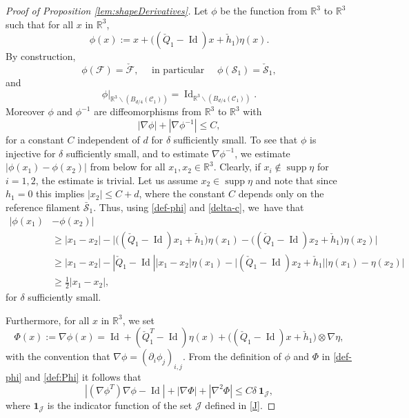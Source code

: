 \documentclass[11pt]{article}
\providecommand{\widecheck}{\check}
\newcommand{\R}{\mathbb{R}}
\DeclareMathOperator{\Id}{Id}
\DeclareMathOperator{\supp}{supp}
\theoremstyle{definition}
\theoremstyle{remark}
\begin{document}
\begin{proof}[Proof of Proposition \ref{lem:shapeDerivatives}]
Let $\phi$ be the function from $\R^3$ to $\R^3$ such that for all $x$ in $\R^3$,
\begin{equation} \label{def-phi}
\phi(x) := x + \bigl((\widecheck Q_1 - \Id)x + \widecheck h_1 \bigr) \eta(x).
\end{equation}
By construction,
\begin{equation} \label{dodomain}
\phi(\mathcal F) = \widecheck {\mathcal F}, \quad \text{ in particular } \quad
\phi(\mathcal S_1) = \widecheck {\mathcal S}_1,
\end{equation}
and
\begin{equation} \label{elaid}
\phi \vert_{\R^3 \smallsetminus (B_{d/4}(\mathcal C_1))} = \Id_{\R^3 \smallsetminus (B_{d/4}(\mathcal C_1))}.
\end{equation}
Moreover $\phi$ and $\phi^{-1}$ are diffeomorphisms from $\R^3$ to $\R^3$
with
\begin{equation}
\label{pourcp}
|\nabla \phi| + |\nabla \phi^{-1}| \leq C,
\end{equation}
for a constant $C$ independent of $d$ for $\delta$ sufficiently small.
To see that $\phi$ is injective for $\delta$ sufficiently small, and to estimate $\nabla \phi^{-1}$, we estimate $|\phi(x_1) - \phi(x_2)|$ from below for all $x_1,x_2 \in \R^3$. Clearly, if $x_i \not \in \supp \eta$ for $i = 1,2$, the estimate is trivial.
Let us assume $x_2 \in \supp \eta$ and note that since $h_1 = 0$ this implies $|x_2| \leq C + d$,
where the constant $C$ depends only on the reference filament $\bar{\mathcal S}_1$.
Thus, using \eqref{def-phi} and \eqref{delta-c}, we~have that
\begin{align*}
|\phi(x_1) &- \phi(x_2)| \\
&\geq |x_1 - x_2| - \big|\big((\widecheck Q_1 - \Id)x_1 + \widecheck h_1 \big) \eta(x_1) - \big((\widecheck Q_1 - \Id)x_2 + \widecheck h_1 \big) \eta(x_2)\big| \\
& \geq |x_1 - x_2| - |\widecheck Q_1 - \Id||x_1 - x_2| \eta(x_1) - \big|(\widecheck Q_1 - \Id)x_2 + \widecheck h_1 \big||\eta(x_1) - \eta(x_2)| \\
& \geq \frac 1 2 |x_1 - x_2|,
\end{align*}
for $\delta$ sufficiently small.

Furthermore, for all $x$ in $\R^3$, we set
\begin{equation} \label{def:Phi}
\Phi(x) := {\nabla\phi(x)} = \Id + (\widecheck Q_1^T - \Id) \eta(x) +
\bigl((\widecheck Q_1 - \Id)x + \widecheck h_1 \bigr) \otimes \nabla \eta,
\end{equation}
with the convention that $\nabla\phi = (\partial_i \phi_j)_{i,j}$.
From the definition of $\phi$ and $\Phi$ in \eqref{def-phi} and \eqref{def:Phi}
it follows that
\begin{equation} \label{esti-mir}
|(\nabla \phi^T) \nabla \phi - \Id|+
|\nabla \Phi|+ |\nabla^2 \Phi| \leq C \delta \ \mathbf{1}_{\mathcal J},
\end{equation}
where $ \mathbf{1}_\mathcal{J}$ is the indicator function of the set $\mathcal{J}$ defined in \eqref{J}.


\end{proof}
\end{document}
